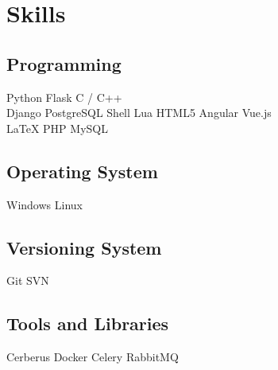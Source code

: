 \documentclass[]{deedy-resume-openfont}
\begin{document}
%
%
\lastupdated

%
%

%
%

\begin{minipage}[t]{0.33\textwidth} 


\section{Skills}
\subsection{Programming}
Python 
\textbullet{} Flask 
\textbullet{} C / C++ 
\\
Django 
\textbullet{} PostgreSQL
\textbullet{} Shell 
\textbullet{} Lua
\textbullet{} HTML5
\textbullet{} Angular
\textbullet{} Vue.js
\\
\LaTeX
\textbullet{} PHP 
\textbullet{} MySQL
\sectionsep

\subsection{Operating System}
Windows 
\textbullet{} Linux 
\sectionsep

\subsection{Versioning System}
Git 
\textbullet{} SVN 
\sectionsep

\subsection{Tools and Libraries}
Cerberus 
\textbullet{} Docker 
\textbullet{} Celery
\textbullet{} RabbitMQ \\
\sectionsep


\end{minipage}
\end{document}
